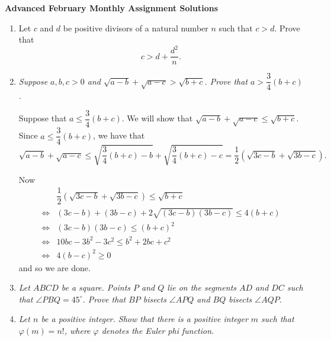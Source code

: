 \documentclass{article}
\begin{document}
\thispagestyle{empty}

\begin{center}
  \textbf{\Large Advanced February Monthly Assignment Solutions}
\end{center}

\vspace{12pt}

\begin{enumerate}[1.]

\vspace{24pt}
\item %
Let $c$ and $d$ be positive divisors of a natural number $n$ such that $c > d$. Prove that $$c > d + \frac{d^2}{n}.$$


\vspace{24pt}
\item %
{\itshape Suppose $a,b,c > 0$ and $\sqrt{a-b} +\sqrt{a-c} > \sqrt{b+c}$. Prove that $a > \dfrac{3}{4} (b+c)$.}

Suppose that $a \leq \dfrac{3}{4} (b + c)$. We will show that $\sqrt{a-b} +\sqrt{a-c} \leq \sqrt{b+c}$. Since $a \leq \dfrac{3}{4} (b + c)$, we have that
\[
	\sqrt{a-b} +\sqrt{a-c} \leq \sqrt{\frac{3}{4}(b + c) - b} + \sqrt{\frac{3}{4}(b + c) - c} = \frac{1}{2} \left(\sqrt{3c - b} + \sqrt{3b - c}\right).
\]

Now
\begin{align*}
	& \dfrac{1}{2} \left(\sqrt{3c - b} + \sqrt{3b - c}\right)  \leq \sqrt{b + c} \\
	\iff & (3c - b) + (3b - c) + 2\sqrt{(3c - b)(3b - c)}  \leq 4(b + c) \\
	\iff & (3c - b)(3b - c) \leq (b + c)^2 \\
	\iff & 10bc - 3b^2 - 3c^2 \leq b^2 + 2bc + c^2 \\
	\iff & 4(b - c)^2 \geq 0
\end{align*}
and so we are done.


\vspace{24pt}
\item %
{\itshape Let $ABCD$ be a square.
Points $P$ and $Q$ lie on the segments $AD$ and $DC$ such that $\angle PBQ = 45^\circ$.
Prove that $BP$ bisects $\angle APQ$ and $BQ$ bisects $\angle AQP$.}


\vspace{24pt}
\item %
{\itshape Let $n$ be a positive integer. Show that there is a positive integer $m$ such that $\varphi(m) = n!$, where $\varphi$ denotes the Euler phi function.}


\end{enumerate}
\end{document}
